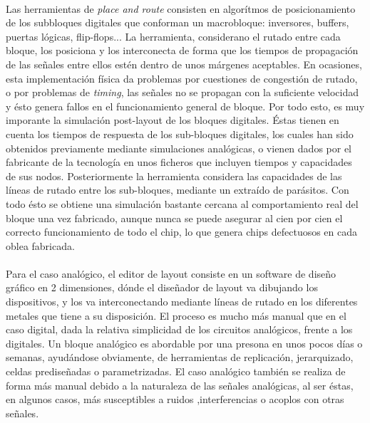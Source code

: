 \paragraph{} Las herramientas de \textit{place and route} consisten en algorítmos
de posicionamiento de los subbloques digitales que conforman un macrobloque:
inversores, buffers, puertas lógicas, flip-flops... La herramienta, considerano el
rutado entre cada bloque, los posiciona y los interconecta de forma que los tiempos
de propagación de las señales entre ellos estén dentro de unos márgenes aceptables.
En ocasiones, esta implementación física da problemas por cuestiones de congestión
de rutado, o por problemas de \textit{timing}, las señales no se propagan con la
suficiente velocidad y ésto genera fallos en el funcionamiento general de bloque.
Por todo esto, es muy imporante la simulación post-layout de los bloques digitales.
Éstas tienen en cuenta los tiempos de respuesta de los sub-bloques digitales, los cuales
han sido obtenidos previamente mediante simulaciones analógicas, o vienen dados por
el fabricante de la tecnología en unos ficheros que incluyen tiempos y capacidades de
sus nodos. Posteriormente la herramienta considera las capacidades de las líneas de
rutado entre los sub-bloques, mediante un extraído de parásitos. Con todo ésto
se obtiene una simulación bastante cercana al comportamiento real del bloque una vez
fabricado, aunque nunca se puede asegurar al cien por cien el correcto funcionamiento
de todo el chip, lo que genera chips defectuosos en cada oblea fabricada.


\paragraph{} Para el caso analógico, el editor de layout consiste en un software
de diseño gráfico en 2 dimensiones, dónde el diseñador de layout va dibujando los
dispositivos, y los va interconectando mediante líneas de rutado en los diferentes
metales que tiene a su disposición. El proceso es mucho más manual que en el caso
digital, dada la relativa simplicidad de los circuitos analógicos, frente a los
digitales. Un bloque analógico es abordable por una presona en unos pocos días o
semanas, ayudándose obviamente, de herramientas de replicación, jerarquizado, celdas
prediseñadas o parametrizadas. El caso analógico también se realiza de forma más
manual debido a la naturaleza de las señales analógicas, al ser éstas, en algunos casos,
más susceptibles a ruidos ,interferencias o acoplos con otras señales.

